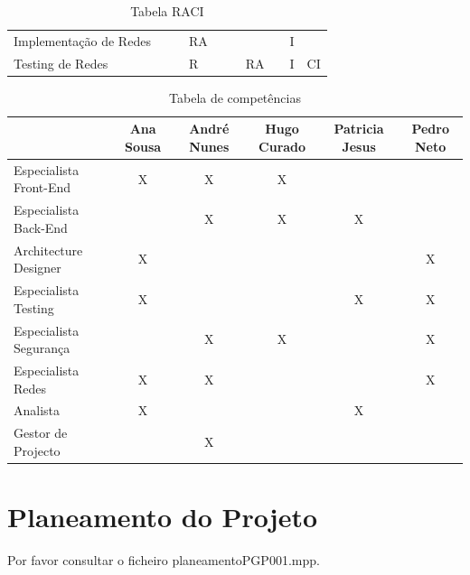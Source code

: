 \documentclass[a4paper]{report}
\begin{document}
\begin{table}[h]
\begin{adjustbox}{width=1.3\textwidth, center=\textwidth}
\begin{tabular}{l|l|l|l|l|l|l|l|l|l}
Implementação de Redes              &                           &                       & RA                    &                           &                          &                         &          & I                 &         \\
Testing de Redes                    &                           &                       & R                    &                           &                          & RA                      &          & I                 & CI      
\end{tabular}
\end{adjustbox}
\caption{Tabela RACI}
\end{table}

\begin{table}[h]
\centering
\label{my-label}
\begin{tabular}{l|c|c|c|c|c}
                       & Ana Sousa & André Nunes & Hugo Curado & Patricia Jesus & Pedro Neto \\ \hline
Especialista Front-End & X         & X           & X           &                &            \\ \hline
Especialista Back-End  &           & X           & X           & X              &            \\ \hline
Architecture Designer  & X         &             &             &                & X          \\ \hline
Especialista Testing   & X         &             &             & X              & X          \\ \hline
Especialista Segurança &           & X           & X           &                & X          \\ \hline
Especialista Redes     & X         & X           &             &                & X          \\ \hline
Analista               & X         &             &             & X              &            \\ \hline
Gestor de Projecto     &           & X            &             &                &            \\
\end{tabular}
\caption{Tabela de competências}
\end{table}

\section{Planeamento do Projeto}
Por favor consultar o ficheiro planeamentoPGP001.mpp.
\pagebreak
\end{document}
